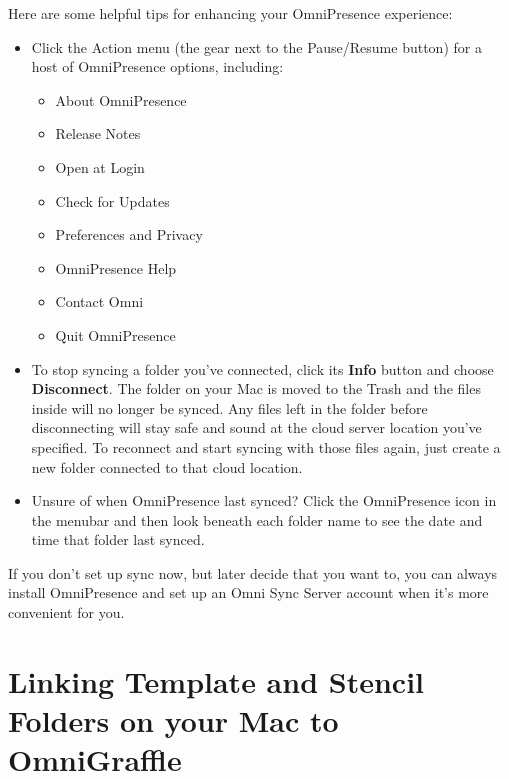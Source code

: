 \documentclass[../main.tex]{subfiles}
\begin{document}
Here are some helpful tips for enhancing your OmniPresence experience:

\begin{itemize}
  \item Click the Action menu (the gear next to the Pause/Resume button) for a host of
    OmniPresence options, including:


    \begin{itemize}
      \item About OmniPresence
      \item Release Notes
      \item Open at Login
      \item Check for Updates
      \item Preferences and Privacy
      \item OmniPresence Help
      \item Contact Omni
      \item Quit OmniPresence
    \end{itemize}
  \item To stop syncing a folder you've connected, click its \textbf{Info} button and choose
    \textbf{Disconnect}. The folder on your Mac is moved to the Trash and the files inside will
    no longer be synced. Any files left in the folder before disconnecting will stay safe and
    sound at the cloud server location you've specified. To reconnect and start syncing with
    those files again, just create a new folder connected to that cloud location.

  \item Unsure of when OmniPresence last synced? Click the OmniPresence icon in the menubar and
    then look beneath each folder name to see the date and time that folder last synced.

\end{itemize}

\begin{ognote}
  If you don't set up sync now, but later decide that you want to, you can always install
  OmniPresence and set up an Omni Sync Server account when it's more convenient for you.
\end{ognote}

\section{Linking Template and Stencil Folders on your Mac to OmniGraffle}
\end{document}
